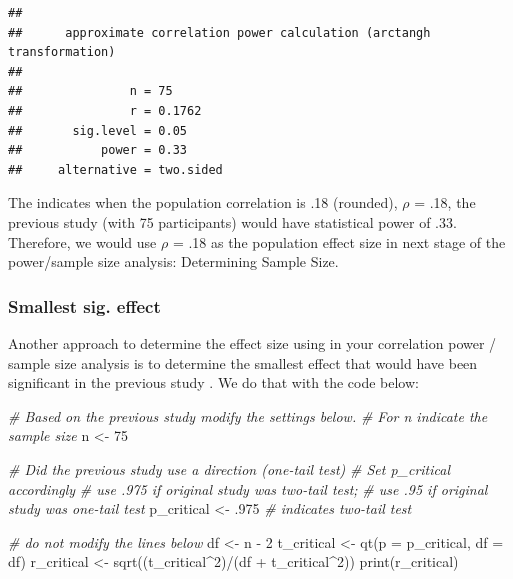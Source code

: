\documentclass[
]{krantz}
\makeatletter
\newenvironment{Shaded}{\begin{snugshade}}{\end{snugshade}}
\newcommand{\AttributeTok}[1]{\textcolor[rgb]{0.61,0.61,0.61}{#1}}
\newcommand{\CommentTok}[1]{\textcolor[rgb]{0.37,0.37,0.37}{\textit{#1}}}
\newcommand{\DecValTok}[1]{\textcolor[rgb]{0.06,0.06,0.06}{#1}}
\newcommand{\FunctionTok}[1]{\textcolor[rgb]{0,0,0}{#1}}
\newcommand{\NormalTok}[1]{#1}
\newcommand{\OtherTok}[1]{\textcolor[rgb]{0.37,0.37,0.37}{#1}}
\newcommand{\SpecialCharTok}[1]{\textcolor[rgb]{0,0,0}{#1}}
\newenvironment{kframe}{%
\medskip{}
\setlength{\fboxsep}{.8em}
 \def\at@end@of@kframe{}%
 \ifinner\ifhmode%
  \def\at@end@of@kframe{\end{minipage}}%
  \begin{minipage}{\columnwidth}%
 \fi\fi%
 \def\FrameCommand##1{\hskip\@totalleftmargin \hskip-\fboxsep
 \colorbox{shadecolor}{##1}\hskip-\fboxsep
     \hskip-\linewidth \hskip-\@totalleftmargin \hskip\columnwidth}%
 \MakeFramed {\advance\hsize-\width
   \@totalleftmargin\z@ \linewidth\hsize
   \@setminipage}}%
 {\par\unskip\endMakeFramed%
 \at@end@of@kframe}
\renewenvironment{Shaded}{\begin{kframe}}{\end{kframe}}
\makeatother
\begin{document}
\begin{verbatim}
## 
##      approximate correlation power calculation (arctangh transformation) 
## 
##               n = 75
##               r = 0.1762
##       sig.level = 0.05
##           power = 0.33
##     alternative = two.sided
\end{verbatim}

The indicates when the population correlation is .18 (rounded), \(\rho\) = .18, the previous study (with 75 participants) would have statistical power of .33. Therefore, we would use \(\rho\) = .18 as the population effect size in next stage of the power/sample size analysis: Determining Sample Size.

\hypertarget{smallest-sig.-effect-2}{%
\subsubsection{Smallest sig. effect}\label{smallest-sig.-effect-2}}

Another approach to determine the effect size using in your correlation power / sample size analysis is to determine the smallest effect that would have been significant in the previous study \citep{lakens2018equivalence}. We do that with the code below:

\begin{Shaded}
\begin{Highlighting}[]
\CommentTok{\# Based on the previous study modify the settings below.}
\CommentTok{\# For n indicate the sample size}
\NormalTok{n }\OtherTok{\textless{}{-}} \DecValTok{75}

\CommentTok{\# Did the previous study use a direction (one{-}tail test)}
\CommentTok{\# Set p\_critical accordingly}
\CommentTok{\# use .975 if original study was two{-}tail test;}
\CommentTok{\# use .95 if original study was one{-}tail test}
\NormalTok{p\_critical }\OtherTok{\textless{}{-}}\NormalTok{ .}\DecValTok{975} \CommentTok{\# indicates two{-}tail test}

\CommentTok{\# do not modify the lines below}
\NormalTok{df }\OtherTok{\textless{}{-}}\NormalTok{ n }\SpecialCharTok{{-}} \DecValTok{2}
\NormalTok{t\_critical }\OtherTok{\textless{}{-}} \FunctionTok{qt}\NormalTok{(}\AttributeTok{p =}\NormalTok{ p\_critical, }\AttributeTok{df =}\NormalTok{ df) }
\NormalTok{r\_critical }\OtherTok{\textless{}{-}} \FunctionTok{sqrt}\NormalTok{((t\_critical}\SpecialCharTok{\^{}}\DecValTok{2}\NormalTok{)}\SpecialCharTok{/}\NormalTok{(df }\SpecialCharTok{+}\NormalTok{ t\_critical}\SpecialCharTok{\^{}}\DecValTok{2}\NormalTok{))}
\FunctionTok{print}\NormalTok{(r\_critical)}
\end{Highlighting}
\end{Shaded}
\end{document}
